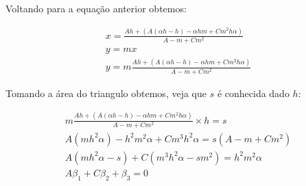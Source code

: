 \documentclass{article}
\begin{document}
	Voltando para a equação anterior obtemos:
	
	\begin{align*}
	x = \frac{Ah+(	A(\alpha h - h) -\alpha hm + Cm^2h\alpha)}{A-m + Cm^2}\\
	y = mx\\
	y = m\frac{Ah+(	A(\alpha h - h) -\alpha hm + Cm^2h\alpha)}{A-m + Cm^2}
	\end{align*}
	
	Tomando a área do triangulo obtemos, veja que $s$ é conhecida dado $h$:
	
	\begin{align*}
	m\frac{Ah+(	A(\alpha h - h) -\alpha hm + Cm^2h\alpha)}{A-m + Cm^2} \times h = s\\
	A(mh^2\alpha) - h^2m^2\alpha + Cm^3h^2\alpha = s(A-m+Cm^2)\\
	A(mh^2\alpha -s) + C(m^3h^2\alpha -sm^2) = h^2m^2\alpha\\
	A\beta_1 + C\beta_2 + \beta_3 = 0
	\end{align*}
\end{document}
